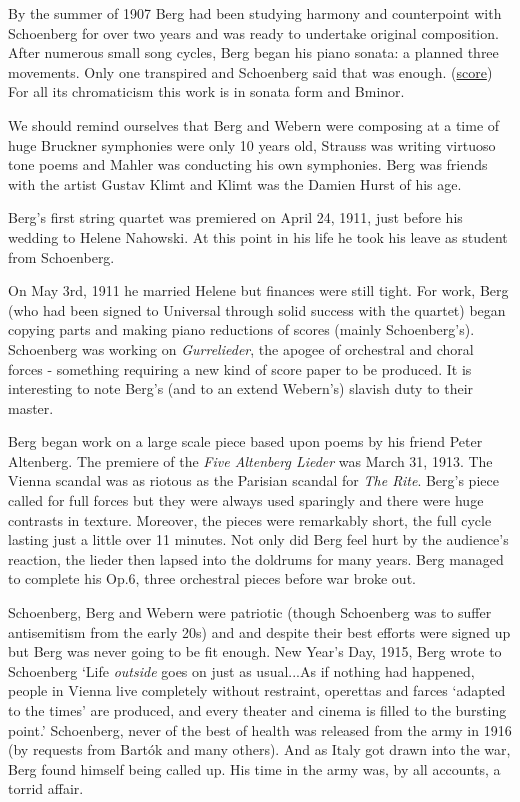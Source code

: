 By the summer of 1907 Berg had been studying harmony and counterpoint with Schoenberg for over two years and was ready to undertake original composition. After numerous small song cycles, Berg began his piano sonata: a planned three movements. Only one transpired and Schoenberg said that was enough. (\href{http://petrucci.mus.auth.gr/imglnks/usimg/7/75/IMSLP234327-SIBLEY1802.21900.4ff7-39087012041663score.pdf}{score})
For all its chromaticism this work is in sonata form and Bminor. 

We should remind ourselves that Berg and Webern were composing at a time of huge Bruckner symphonies were only 10 years old, Strauss was writing virtuoso tone poems and Mahler was conducting his own symphonies. 
Berg was friends with the artist Gustav Klimt and Klimt was the Damien Hurst of his age. 

Berg's first string quartet was premiered on April 24, 1911, just before his wedding to Helene Nahowski. At this point in his life he took his leave as student from Schoenberg. 

On May 3rd, 1911 he married Helene but finances were still tight. For work, Berg (who had been signed to Universal through solid success with the quartet) began copying parts and making piano reductions of scores (mainly Schoenberg's). Schoenberg was working on \textit{Gurrelieder}, the apogee of orchestral and choral forces - something requiring a new kind of score paper to be produced. It is interesting to note Berg's (and to an extend Webern's) slavish duty to their master.  

Berg began work on a large scale piece based upon poems by his friend Peter Altenberg. The premiere of the \textit{Five Altenberg Lieder} was March 31, 1913. The Vienna scandal was as riotous as the Parisian scandal for \textit{The Rite}. Berg's piece called for full forces but they were always used sparingly and there were huge contrasts in texture. Moreover, the pieces were remarkably short, the full cycle lasting just a little over 11 minutes. Not only did Berg feel hurt by the audience's reaction, the lieder then lapsed into the doldrums for many years. Berg managed to complete his Op.6, three orchestral pieces before war broke out. 

Schoenberg, Berg and Webern were patriotic (though Schoenberg was to suffer antisemitism from the early 20s) and and despite their best efforts were signed up but Berg was never going to be fit enough. New Year's Day, 1915, Berg wrote to Schoenberg `Life \textit{outside} goes on just as usual...As if nothing had happened, people in Vienna live completely without restraint, operettas and farces `adapted to the times' are produced, and every theater and cinema is filled to the bursting point.' Schoenberg, never of the best of health was released from the army in 1916 (by requests from Bart\'ok and many others). And as Italy got drawn into the war, Berg found himself being called up. His time in the army was, by all accounts, a torrid affair.  

